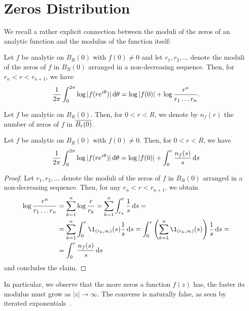 \section{Zeros Distribution}
\label{sec:zeros}

We recall a rather explicit connection between the moduli of the zeros of an analytic function and the modulus of the function itself:

\begin{theorem} \label{thm:jensen}
    Let $f$ be analytic on $B_{R}(0)$ with $f(0) \neq 0$ and let $r_1, r_2, \hdots$ denote the moduli of the zeros of $f$ in $B_{R}(0)$ arranged in a non-decreasing sequence. Then, for $r_n < r < r_{n+1}$, we have
    $$ \frac{1}{2 \pi} \int_0^{2\pi} \log \vert f(r e^{i \theta}) \vert \mathop{}\!\mathrm{d} \theta = \log \vert f(0) \vert + \log \frac{r^n}{r_1 \hdots r_n}. $$
\end{theorem}

\begin{definition}
    Let $f$ be analytic on $B_{R}(0)$. Then, for $0 < r < R$, we denote by $n_f(r)$ the number of zeros of $f$ in $\overline{B_{r}(0)}$.
\end{definition}

\begin{corollary}
    Let $f$ be analytic on $B_{R}(0)$ with $f(0) \neq 0$. Then, for $0 < r < R$, we have
    $$ \frac{1}{2 \pi} \int_0^{2\pi} \log \vert f(re^{i \theta}) \vert \mathop{}\!\mathrm{d} \theta = \log \vert f(0) \vert + \int_0^r \frac{n_f(s)}{s} \mathop{}\!\mathrm{d} s $$
\end{corollary}

\begin{proof}
    Let $r_1, r_2, \hdots$ denote the moduli of the zeros of $f$ in $B_{R}(0)$ arranged in a non-decreasing sequence. Then, for any $r_n < r < r_{n+1}$, we obtain
    \begin{align*}
        \log \frac{r^n}{r_1 \hdots r_n} &= \sum_{k=1}^n \log \frac{r}{r_k} = \sum_{k=1}^n \int_{r_k}^r \frac{1}{s} \diff s = \\
        &= \sum_{k=1}^n \int_0^r \1_{(r_k, \infty)}(s) \frac{1}{s} \diff s = \int_0^r \left( \sum_{k=1}^n \1_{(r_k, \infty)}(s) \right) \frac{1}{s} \diff s = \\
        &= \int_0^r \frac{n_f(s)}{s} \diff s
    \end{align*}
    and  concludes the claim.
\end{proof}

In particular, we observe that the more zeros a function $f(z)$ has, the faster its modulus must grow as $\vert z \vert \to \infty$. The converse is naturally false, as seen by iterated exponentials~\cite{segal-complex-analysis}.

